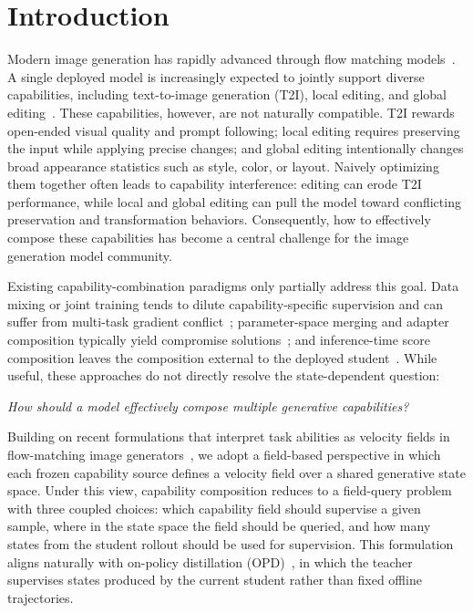 \documentclass{llmxive}
\begin{document}
\setcounter{tocdepth}{3}
\tableofcontents


\section{Introduction}
\label{sec:introduction}

Modern image generation has rapidly advanced through flow matching models~\cite{ho2020denoising,rombach2022high,peebles2023scalable,esser2024scaling,cai2025z,podell2024sdxl}. A single deployed model is increasingly expected to jointly support diverse capabilities, including text-to-image generation (T2I), local editing, and global editing~\cite{brooks2023instructpix2pix,yu2025anyedit,chow2025editmgt}. These capabilities, however, are not naturally compatible. T2I rewards open-ended visual quality and prompt following; local editing requires preserving the input while applying precise changes; and global editing intentionally changes broad appearance statistics such as style, color, or layout. Naively optimizing them together often leads to capability interference: editing can erode T2I performance, while local and global editing can pull the model toward conflicting preservation and transformation behaviors. Consequently, how to effectively compose these capabilities has become a central challenge for the image generation model community.


Existing capability-combination paradigms only partially address this goal. Data mixing or joint training tends to dilute capability-specific supervision and can suffer from multi-task gradient conflict~\cite{ilharco2022editing,wortsman2022model,matena2022merging,chen2018gradnorm,sener2018multi,javaloy2021rotograd}; parameter-space merging and adapter composition typically yield compromise solutions~\cite{ainsworth2022git,yadav2023ties,gal2022image,ruiz2023dreambooth,pfeiffer2021adapterfusion}; and inference-time score composition leaves the composition external to the deployed student~\cite{liu2022compositional,du2023reduce,bar2023multidiffusion}. While useful, these approaches do not directly resolve the state-dependent question: 

\textit{How should a model effectively compose multiple generative capabilities?}


Building on recent formulations that interpret task abilities as velocity fields in flow-matching image generators~\cite{lipman2022flow,liu2022flow,albergo2025stochastic,tong2023improving,dao2023flow}, we adopt a field-based perspective in which each frozen capability source defines a velocity field over a shared generative state space. Under this view, capability composition reduces to a field-query problem with three coupled choices: which capability field should supervise a given sample, where in the state space the field should be queried, and how many states from the student rollout should be used for supervision. This formulation aligns naturally with on-policy distillation (OPD)~\cite{ross2011reduction,gu2024minillm,agarwal2024policy,jia2026asymmetric}, in which the teacher supervises states produced by the current student rather than fixed offline trajectories.
\end{document}

